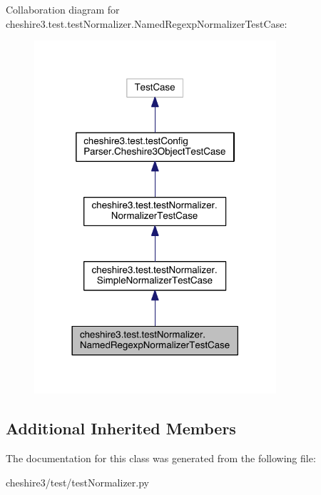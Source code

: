 Collaboration diagram for cheshire3.\-test.\-test\-Normalizer.\-Named\-Regexp\-Normalizer\-Test\-Case\-:
\nopagebreak
\begin{figure}[H]
\begin{center}
\leavevmode
\includegraphics[width=254pt]{classcheshire3_1_1test_1_1test_normalizer_1_1_named_regexp_normalizer_test_case__coll__graph}
\end{center}
\end{figure}
\subsection*{Additional Inherited Members}


The documentation for this class was generated from the following file\-:\begin{DoxyCompactItemize}
\item 
cheshire3/test/test\-Normalizer.\-py\end{DoxyCompactItemize}
